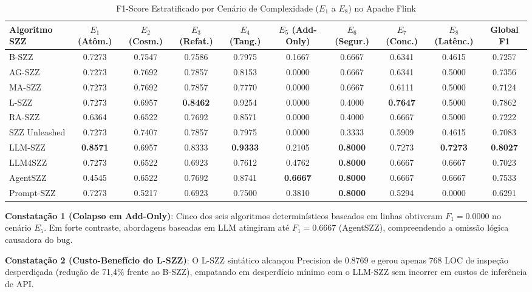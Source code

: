 \documentclass[10pt,journal,compsoc]{IEEEtran}
\begin{document}
\begin{table}[t]
\centering
\caption{F1-Score Estratificado por Cenário de Complexidade ($E_1$ a $E_8$) no Apache Flink}
\label{tab:estratos}
\begin{tabular}{lccccccccc}
\toprule
\textbf{Algoritmo SZZ} & \textbf{$E_1$ (Atôm.)} & \textbf{$E_2$ (Cosm.)} & \textbf{$E_3$ (Refat.)} & \textbf{$E_4$ (Tang.)} & \textbf{$E_5$ (Add-Only)} & \textbf{$E_6$ (Segur.)} & \textbf{$E_7$ (Conc.)} & \textbf{$E_8$ (Latênc.)} & \textbf{Global F1} \\
\midrule
B-SZZ & 0.7273 & 0.7547 & 0.7586 & 0.7975 & 0.1667 & 0.6667 & 0.6341 & 0.4615 & 0.7257 \\
AG-SZZ & 0.7273 & 0.7692 & 0.7857 & 0.8153 & 0.0000 & 0.6667 & 0.6341 & 0.5000 & 0.7356 \\
MA-SZZ & 0.7273 & 0.7692 & 0.7857 & 0.7770 & 0.0000 & 0.6667 & 0.6111 & 0.5000 & 0.7124 \\
L-SZZ & 0.7273 & 0.6957 & \textbf{0.8462} & 0.9254 & 0.0000 & 0.4000 & \textbf{0.7647} & 0.5000 & 0.7862 \\
RA-SZZ & 0.6364 & 0.6522 & 0.7692 & 0.8571 & 0.0000 & 0.4000 & 0.6667 & 0.5000 & 0.7222 \\
SZZ Unleashed & 0.7273 & 0.7407 & 0.7857 & 0.7975 & 0.0000 & 0.3333 & 0.5909 & 0.4615 & 0.7083 \\
LLM-SZZ & \textbf{0.8571} & 0.6957 & 0.8333 & \textbf{0.9333} & 0.2105 & \textbf{0.8000} & 0.7273 & \textbf{0.7273} & \textbf{0.8027} \\
LLM4SZZ & 0.7273 & 0.6522 & 0.6923 & 0.7612 & 0.4762 & \textbf{0.8000} & 0.6667 & 0.6667 & 0.7023 \\
AgentSZZ & 0.4545 & 0.6522 & 0.7692 & 0.8741 & \textbf{0.6667} & \textbf{0.8000} & 0.6667 & 0.6667 & 0.7533 \\
Prompt-SZZ & 0.7273 & 0.5217 & 0.6923 & 0.7500 & 0.3810 & \textbf{0.8000} & 0.5294 & 0.0000 & 0.6291 \\
\bottomrule
\end{tabular}
\end{table}

\textbf{Constatação 1 (Colapso em Add-Only)}: Cinco dos seis algoritmos determinísticos baseados em linhas obtiveram $F_1 = 0.0000$ no cenário $E_5$. Em forte contraste, abordagens baseadas em LLM atingiram até $F_1 = 0.6667$ (AgentSZZ), compreendendo a omissão lógica causadora do bug.

\textbf{Constatação 2 (Custo-Benefício do L-SZZ)}: O L-SZZ sintático alcançou Precision de 0.8769 e gerou apenas 768 LOC de inspeção desperdiçada (redução de 71,4\% frente ao B-SZZ), empatando em desperdício mínimo com o LLM-SZZ sem incorrer em custos de inferência de API.
\end{document}
